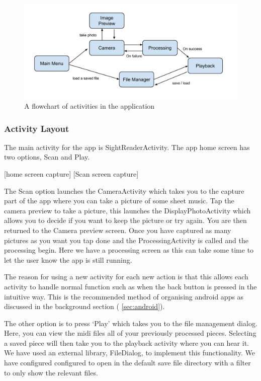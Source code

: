             \begin{figure}[ht!]
                \centering
                \includegraphics[width=150mm]{./assets/activitiesdiag.png}
                \caption{A flowchart of activities in the application}
                \label{image:activitydiag}
            \end{figure}

\subsubsection{Activity Layout}

The main activity for the app is SightReaderActivity. The app home screen has two options, Scan and Play.

[home screen capture] [Scan screen capture]

The Scan option launches the CameraActivity which takes you to the capture part of the app where you can take a picture of some sheet music. Tap the camera preview to take a picture, this launches the DisplayPhotoActivity which allows you to decide if you want to keep the picture or try again. You are then returned to the Camera preview screen. Once you have captured as many pictures as you want you tap done and the ProcessingActivity is called and the processing begin. Here we have a processing screen as this can take some time to let the user know the app is still running.

The reason for using a new activity for each new action is that this allows each activity to handle normal function such as when the back button is pressed in the intuitive way. This is the recommended method of organising android apps as discussed in the background section ( \autoref{sec:android}).

The other option is to press ‘Play’ which takes you to the file management dialog. Here, you can view the midi files all of your previously processed pieces. Selecting a saved piece will then take you to the playback activity where you can hear it. We have used an external library, FileDialog\cite{FileDialog}, to implement this functionality. We have configured configured to open in the default save file directory with a filter to only show the relevant files.


